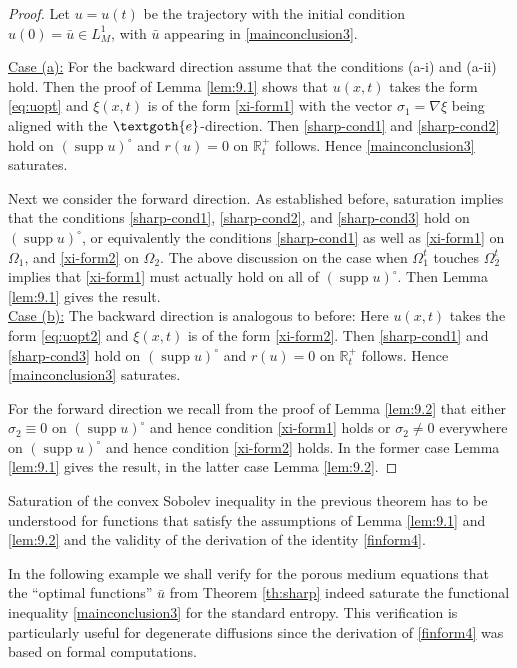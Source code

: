 \documentclass[reqno]{amsart}
\newcommand{\R}{\mathbb{R}}
\DeclareMathOperator{\supp}{supp}
\begin{document}
\begin{proof}
Let $u=u(t)$ be the trajectory with the initial condition $u(0)=\bar u\in L^1_M$, with $\bar u$ appearing in \eqref{mainconclusion3}. 

\noindent
\underline{Case (a):} For the backward direction assume that the conditions (a-i) and (a-ii) hold. Then the proof of Lemma \ref{lem:9.1} shows that $u(x,t)$ takes the form \eqref{eq:uopt} and $\xi(x,t)$ is of the form \eqref{xi-form1} with the vector $\sigma_1=\nabla \xi$ being aligned with the $\textgoth{e}$-direction. Then \eqref{sharp-cond1} and \eqref{sharp-cond2} hold on $(\supp u)^\circ$ and $r(u)=0$ on $\R^+_t$ follows. Hence \eqref{mainconclusion3} saturates.

Next we consider the forward direction. As established before, saturation implies that the conditions \eqref{sharp-cond1}, \eqref{sharp-cond2}, and \eqref{sharp-cond3} hold on $(\supp u)^\circ$, or equivalently the conditions \eqref{sharp-cond1} as well as  \eqref{xi-form1} on $\Omega_1$,  and  \eqref{xi-form2} on $\Omega_2$. The above discussion on the case when $\Omega_1^t$ touches $\Omega_2^t$ implies that \eqref{xi-form1} must actually hold on all of $(\supp u)^\circ$. Then Lemma \ref{lem:9.1} gives the result.\\
    
\noindent
\underline{Case (b):} The backward direction is analogous to before: Here $u(x,t)$ takes the form \eqref{eq:uopt2} and $\xi(x,t)$ is of the form \eqref{xi-form2}. Then \eqref{sharp-cond1} and \eqref{sharp-cond3} hold on $(\supp u)^\circ$ and $r(u)=0$ on $\R^+_t$ follows. Hence \eqref{mainconclusion3} saturates.

For the forward direction we recall from the proof of Lemma \ref{lem:9.2} that either $\sigma_2\equiv0$ on $(\supp u)^\circ$ and hence condition \eqref{xi-form1} holds or $\sigma_2\ne0$ everywhere on $(\supp u)^\circ$  and hence condition \eqref{xi-form2} holds. In the former case Lemma \ref{lem:9.1} gives the result, in the latter case Lemma \ref{lem:9.2}.
\end{proof}

Saturation of the convex Sobolev inequality in the previous theorem has to be understood for functions that satisfy the assumptions of Lemma \ref{lem:9.1} and \ref{lem:9.2} and the validity of the derivation of the identity \eqref{finform4}.


In the following example we shall verify for the porous medium equations that the ``optimal functions'' $\bar u$ from Theorem \ref{th:sharp} indeed saturate the functional inequality \eqref{mainconclusion3} for the standard entropy. This verification is particularly useful for degenerate diffusions since the derivation of \eqref{finform4} was based on formal computations.
\end{document}
